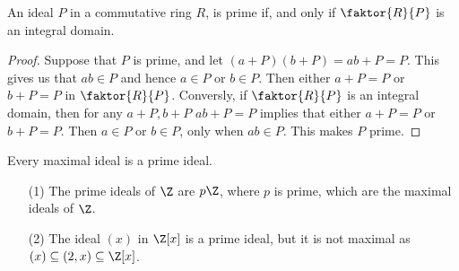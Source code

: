 \begin{lemma}\label{1.4.4}
    An ideal $P$ in a commutative ring $R$, is prime if, and
    only if $\faktor{R}{P}$ is an integral domain.
\end{lemma}
\begin{proof}
    Suppose that $P$ is prime, and let  $(a+P)(b+P)=ab+P=P$. This gives us that
    $ab \in P$ and hence  $a \in P$ or  $b \in P$. Then either $a+P=P$ or $b+P=P$
    in $\faktor{R}{P}$. Conversly, if $\faktor{R}{P}$ is an integral domain, then
     for any $a+P,b+P$  $ab+P=P$ implies that either $a+P=P$ or  $b+P=P$. Then
     $a \in P$ or  $b \in P$, only when  $ab \in P$. This makes  $P$ prime.
\end{proof}
\begin{corollary}
    Every maximal ideal is a prime ideal.
\end{corollary}

\begin{example}\label{1.17}
    \begin{enumerate}
        \item[(1)] The prime ideals of $\Z$ are $p\Z$, where $p$ is prime, which
            are the maximal ideals of $\Z$.

        \item[(2)] The ideal $(x)$ in $\Z[x]$ is a prime ideal, but it is not
            maximal as $(x) \subseteq (2,x) \subseteq \Z[x]$.
    \end{enumerate}
\end{example}
